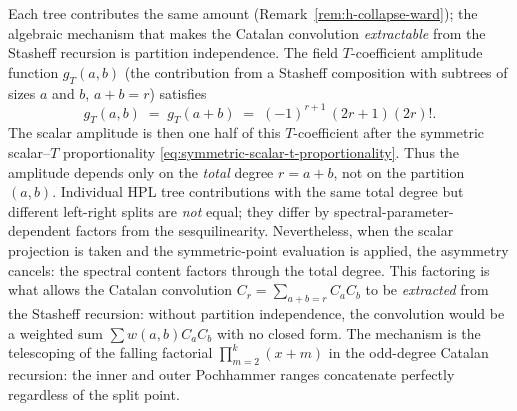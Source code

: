 \begin{remark}
\label{rem:partition-independence}%
%
%
Each tree contributes the same
amount (Remark~\ref{rem:h-collapse-ward}); the algebraic mechanism
that makes the Catalan convolution \emph{extractable} from the
Stasheff recursion is partition independence.
The field \(T\)-coefficient amplitude function \(g_T(a,b)\) (the contribution
from a Stasheff composition with subtrees of sizes $a$ and
$b$, $a+b = r$) satisfies
\begin{equation}\label{eq:partition-independence}
g_T(a,b)
\;=\;
g_T(a+b)
\;=\;
(-1)^{r+1}\,(2r+1)(2r)!.
\end{equation}
The scalar amplitude is then one half of this \(T\)-coefficient
after the symmetric scalar--\(T\) proportionality
\eqref{eq:symmetric-scalar-t-proportionality}.  Thus the amplitude
depends only on the
\emph{total} degree $r = a + b$, not on the partition
$(a,b)$. Individual HPL tree contributions with the same
total degree but different left-right splits are \emph{not}
equal; they differ by spectral-parameter-dependent
factors from the sesquilinearity. Nevertheless, when the
scalar projection is taken and the symmetric-point
evaluation is applied, the asymmetry cancels: the spectral
content factors through the total degree. This factoring
is what allows the Catalan convolution
$C_r = \sum_{a+b=r} C_a C_b$ to be \emph{extracted} from the
Stasheff recursion: without partition independence, the
convolution would be a weighted sum $\sum w(a,b) C_a C_b$
with no closed form. The mechanism is the telescoping of the
falling factorial $\prod_{m=2}^{k}(x+m)$ in the odd-degree
Catalan recursion: the inner and outer Pochhammer
ranges concatenate perfectly regardless of the split point.
\end{remark}


